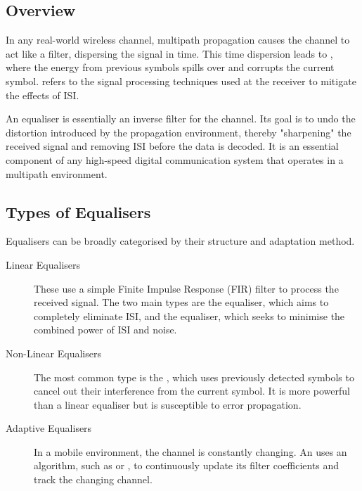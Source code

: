 \subsection{Overview}

In any real-world wireless channel, multipath propagation causes the channel to act like a filter, dispersing the signal in time. This time dispersion leads to , where the energy from previous symbols spills over and corrupts the current symbol.  refers to the signal processing techniques used at the receiver to mitigate the effects of ISI.

\begin{keyconcept}
    An equaliser is essentially an inverse filter for the channel. Its goal is to undo the distortion introduced by the propagation environment, thereby "sharpening" the received signal and removing ISI before the data is decoded. It is an essential component of any high-speed digital communication system that operates in a multipath environment.
\end{keyconcept}


\subsection{Types of Equalisers}

Equalisers can be broadly categorised by their structure and adaptation method.
\begin{description}
    \item[Linear Equalisers] These use a simple Finite Impulse Response (FIR) filter to process the received signal. The two main types are the  equaliser, which aims to completely eliminate ISI, and the  equaliser, which seeks to minimise the combined power of ISI and noise.
    \item[Non-Linear Equalisers] The most common type is the , which uses previously detected symbols to cancel out their interference from the current symbol. It is more powerful than a linear equaliser but is susceptible to error propagation.
    \item[Adaptive Equalisers] In a mobile environment, the channel is constantly changing. An  uses an algorithm, such as  or , to continuously update its filter coefficients and track the changing channel.
\end{description}



